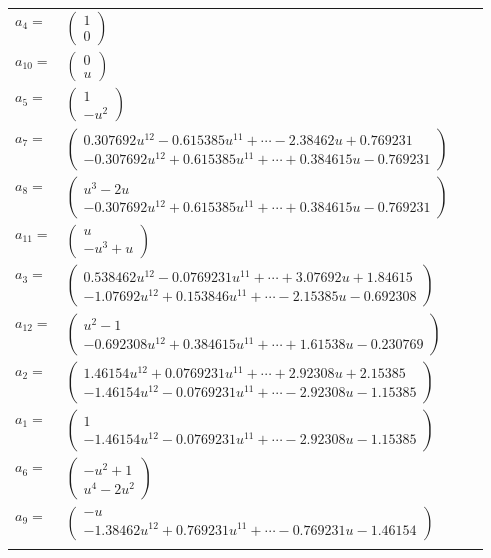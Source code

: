 \documentclass[1p]{elsarticle_modified}
\theoremstyle{definition}
\begin{document}
\begin{tabular}{m{7pt} m{180pt} m{7pt} m{180pt} }
\flushright $a_{4}=$&$\begin{pmatrix}1\\0\end{pmatrix}$ \\
\flushright $a_{10}=$&$\begin{pmatrix}0\\u\end{pmatrix}$ \\
\flushright $a_{5}=$&$\begin{pmatrix}1\\- u^2\end{pmatrix}$ \\
\flushright $a_{7}=$&$\begin{pmatrix}0.307692 u^{12}-0.615385 u^{11}+\cdots-2.38462 u+0.769231\\-0.307692 u^{12}+0.615385 u^{11}+\cdots+0.384615 u-0.769231\end{pmatrix}$ \\
\flushright $a_{8}=$&$\begin{pmatrix}u^3-2 u\\-0.307692 u^{12}+0.615385 u^{11}+\cdots+0.384615 u-0.769231\end{pmatrix}$ \\
\flushright $a_{11}=$&$\begin{pmatrix}u\\- u^3+u\end{pmatrix}$ \\
\flushright $a_{3}=$&$\begin{pmatrix}0.538462 u^{12}-0.0769231 u^{11}+\cdots+3.07692 u+1.84615\\-1.07692 u^{12}+0.153846 u^{11}+\cdots-2.15385 u-0.692308\end{pmatrix}$ \\
\flushright $a_{12}=$&$\begin{pmatrix}u^2-1\\-0.692308 u^{12}+0.384615 u^{11}+\cdots+1.61538 u-0.230769\end{pmatrix}$ \\
\flushright $a_{2}=$&$\begin{pmatrix}1.46154 u^{12}+0.0769231 u^{11}+\cdots+2.92308 u+2.15385\\-1.46154 u^{12}-0.0769231 u^{11}+\cdots-2.92308 u-1.15385\end{pmatrix}$ \\
\flushright $a_{1}=$&$\begin{pmatrix}1\\-1.46154 u^{12}-0.0769231 u^{11}+\cdots-2.92308 u-1.15385\end{pmatrix}$ \\
\flushright $a_{6}=$&$\begin{pmatrix}- u^2+1\\u^4-2 u^2\end{pmatrix}$ \\
\flushright $a_{9}=$&$\begin{pmatrix}- u\\-1.38462 u^{12}+0.769231 u^{11}+\cdots-0.769231 u-1.46154\end{pmatrix}$\\&\end{tabular}
\end{document}
